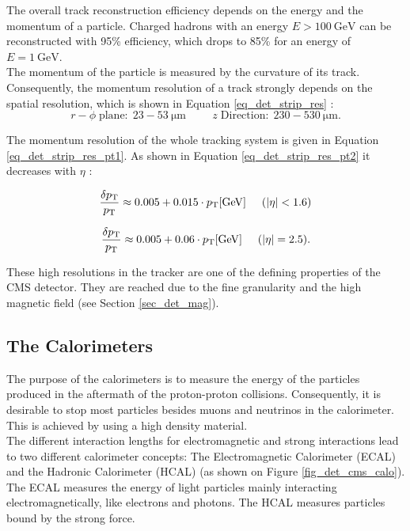 The overall track reconstruction efficiency depends on the energy and the momentum of a particle. Charged hadrons with an energy $E > \SI{100}{\giga \electronvolt}$ can be reconstructed with 95\% efficiency, which drops to 85\% for an energy of $E = \SI{1}{ \giga \electronvolt}$. \\
The momentum of the particle is measured by the curvature of its track. Consequently, the momentum resolution of a track strongly depends on the spatial resolution, which is shown in Equation \ref{eq_det_strip_res} \cite{cmsTDR1}:  \\ 

\begin{equation}
r-\phi \; \mathrm{plane}: \; 23-53 \SI{}{\micro \meter} \hspace{1cm} z\;\mathrm{Direction}: \; 230-530 \SI{}{\micro \meter}.
\label{eq_det_strip_res}
\end{equation}

\newpage
The momentum resolution of the whole tracking system is given in Equation \ref{eq_det_strip_res_pt1}. As shown in Equation \ref{eq_det_strip_res_pt2} it decreases with $\eta$  \cite{Karimäki:368412,Adam:934067}:

\begin{equation}
\frac{\delta p_{\mathrm{T}}}{p_{\mathrm{T}}} \approx 0.005 + 0.015 \cdot p_{\mathrm{T}} [\SI{}{\giga \electronvolt}] \hspace{0.5cm} (|\eta|<1.6)
\label{eq_det_strip_res_pt1}
\end{equation}

\begin{equation}
\frac{\delta p_{\mathrm{T}}}{p_{\mathrm{T}}} \approx 0.005 + 0.06 \cdot p_{\mathrm{T}} [\SI{}{\giga \electronvolt}] \hspace{0.5cm} (|\eta|=2.5).
\label{eq_det_strip_res_pt2}
\end{equation}

These high resolutions in the tracker are one of the defining properties of the CMS detector. They are reached due to the fine granularity and the high magnetic field (see Section \ref{sec_det_mag}). \\

\subsection{The Calorimeters}

The purpose of the calorimeters is to measure the energy of the particles produced in the aftermath of the proton-proton collisions. Consequently, it is desirable to stop most particles besides muons and neutrinos in the calorimeter. This is achieved by using a high density material.\\
The different interaction lengths for electromagnetic and strong interactions lead to two different calorimeter concepts: The Electromagnetic Calorimeter (ECAL) and the Hadronic Calorimeter (HCAL) (as shown on Figure \ref{fig_det_cms_calo}). The ECAL measures the energy of light particles mainly interacting electromagnetically, like electrons and photons. The HCAL measures particles bound by the strong force.\\

